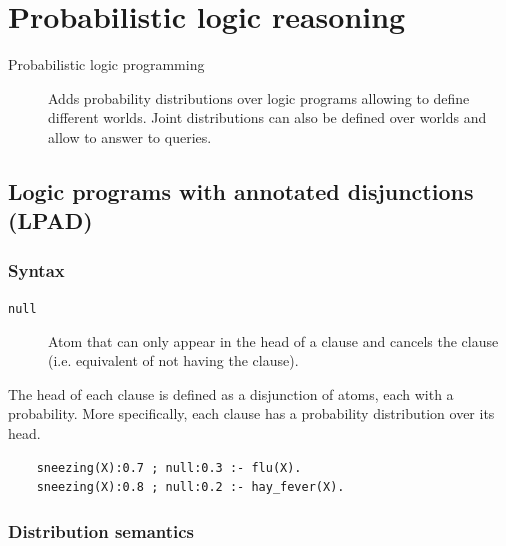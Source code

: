 \chapter{Probabilistic logic reasoning}

\begin{description}
    \item[Probabilistic logic programming] 
        Adds probability distributions over logic programs allowing to define different worlds.
        Joint distributions can also be defined over worlds and allow to answer to queries.
\end{description}



\section{Logic programs with annotated disjunctions (LPAD)}

\subsection{Syntax}

\begin{description}
    \item[\texttt{null}] 
        Atom that can only appear in the head of a clause and 
        cancels the clause (i.e. equivalent of not having the clause).
\end{description}

The head of each clause is defined as a disjunction of atoms, each with a probability.
More specifically, each clause has a probability distribution over its head.

\begin{example}
    \phantom{}
    \begin{lstlisting}
    sneezing(X):0.7 ; null:0.3 :- flu(X).
    sneezing(X):0.8 ; null:0.2 :- hay_fever(X).
    \end{lstlisting}
\end{example}


\subsection{Distribution semantics}

